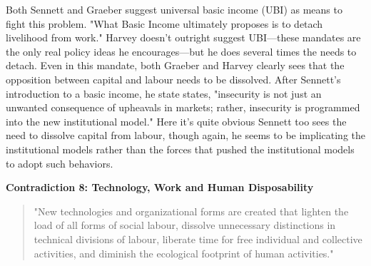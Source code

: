 \documentclass[12pt,a4paper]{article}
\begin{document}
Both Sennett and Graeber suggest universal basic income (UBI) as means to fight this problem. "What Basic Income ultimately proposes is to detach livelihood from work." \cite{bs}  Harvey doesn't outright suggest UBI---these mandates are the only real policy ideas he encourages---but he does several times the needs to detach. Even in this mandate, both Graeber and Harvey clearly sees that the opposition between capital and labour needs to be dissolved. After Sennett's introduction to a basic income, he state states, "insecurity is not just an unwanted consequence of upheavals in markets; rather, insecurity is programmed into the new institutional model." \cite{new} Here it's quite obvious Sennett too sees the need to dissolve capital from labour, though again, he seems to be implicating the institutional models rather than the forces that pushed the institutional models to adopt such behaviors.

\textbf{Contradiction 8: Technology, Work and Human Disposability}
\begin{quotation} {\color{G-Moon}
    \noindent "New technologies and organizational forms are created that lighten the load of all forms of social labour, dissolve unnecessary distinctions in technical divisions of labour, liberate time for free individual and collective activities, and diminish the ecological footprint of human activities." \cite{con}}
\end{quotation}















\clearpage


\end{document}
